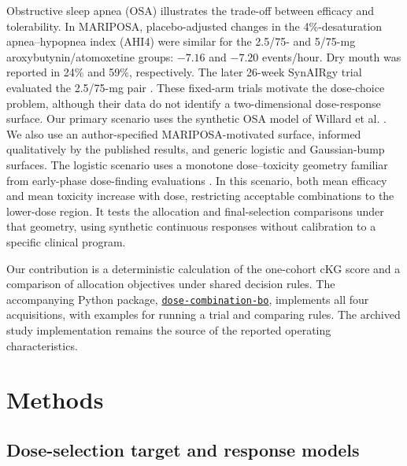 \documentclass[11pt]{article}
\newcommand{\rev}[1]{{#1}}
\begin{document}
\rev{Obstructive sleep apnea (OSA) illustrates the trade-off between efficacy and tolerability.} \rev{In MARIPOSA, placebo-adjusted changes in the 4\%-desaturation apnea--hypopnea index (AHI4) were similar for the 2.5/75- and 5/75-mg aroxybutynin/atomoxetine groups: $-7.16$ and $-7.20$ events/hour.} Dry mouth was reported in 24\% and 59\%, respectively. The later 26-week SynAIRgy trial evaluated the 2.5/75-mg pair \citep{schweitzer2023,strollo2026}. \rev{These fixed-arm trials motivate the dose-choice problem, although their data do not identify a two-dimensional dose-response surface.} Our primary scenario uses \rev{the synthetic OSA model of Willard et al.} \citep{willardobd}. \rev{We also use an author-specified MARIPOSA-motivated surface, informed qualitatively by the published results, and generic logistic and Gaussian-bump surfaces.} The logistic scenario uses a monotone dose--toxicity geometry familiar from early-phase dose-finding evaluations \citep{flournoy2020}. \rev{In this scenario, both mean efficacy and mean toxicity increase with dose, restricting acceptable combinations to the lower-dose region. It tests the allocation and final-selection comparisons under that geometry, using synthetic continuous responses without calibration to a specific clinical program.}

\rev{Our contribution is a deterministic calculation of the one-cohort cKG score and a comparison of allocation objectives under shared decision rules. The accompanying Python package, \href{https://github.com/clairexinzhuwang/dose-combination-bo}{\texttt{dose-combination-bo}}, implements all four acquisitions, with examples for running a trial and comparing rules. The archived study implementation remains the source of the reported operating characteristics.}

\section{Methods}\label{sec:methods}

\subsection{Dose-selection target and response models}
\end{document}

